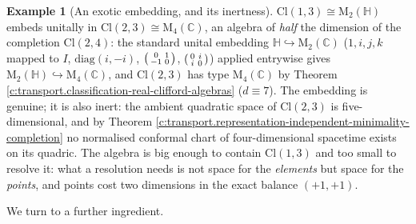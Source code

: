 \documentclass[11pt]{article}
\theoremstyle{definition}
\newtheorem{example}[theorem]{Example}
\theoremstyle{plain}
\providecommand{\C}{}\renewcommand{\C}{\mathbb{C}}
\providecommand{\Cl}{}\renewcommand{\Cl}{\mathrm{Cl}}
\providecommand{\HH}{}\renewcommand{\HH}{\mathbb{H}}
\providecommand{\Mat}{}\renewcommand{\Mat}{\mathrm{M}}
\begin{document}
\begin{example}[An exotic embedding, and its inertness]\label{c:note.transport.exotic-embedding-inertness}
$\Cl(1,3) \cong \Mat_2(\HH)$ embeds unitally in $\Cl(2,3) \cong \Mat_4(\C)$, an algebra of \emph{half} the dimension of the completion $\Cl(2,4)$: the standard unital embedding $\HH \hookrightarrow \Mat_2(\C)$ ($1, i, j, k$ mapped to $I$, $\mathrm{diag}(i, -i)$, $\begin{psmallmatrix}0&1\\-1&0\end{psmallmatrix}$, $\begin{psmallmatrix}0&i\\i&0\end{psmallmatrix}$) applied entrywise gives $\Mat_2(\HH) \hookrightarrow \Mat_4(\C)$, and $\Cl(2,3)$ has type $\Mat_4(\C)$ by Theorem \ref{c:transport.classification-real-clifford-algebras} ($d \equiv 7$). The embedding is genuine; it is also inert: the ambient quadratic space of $\Cl(2,3)$ is five-dimensional, and by Theorem \ref{c:transport.representation-independent-minimality-completion} no normalised conformal chart of four-dimensional spacetime exists on its quadric. The algebra is big enough to contain $\Cl(1,3)$ and too small to resolve it: what a resolution needs is not space for the \emph{elements} but space for the \emph{points}, and points cost two dimensions in the exact balance $(+1,+1)$.
\end{example}

We turn to a further ingredient.
\end{document}
